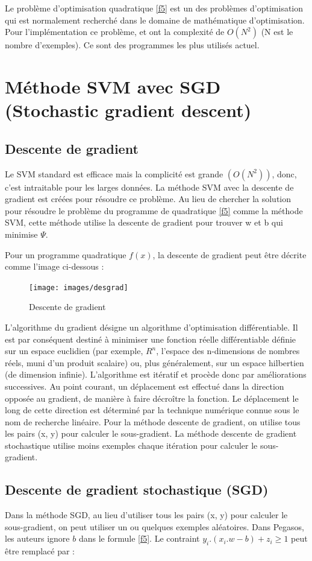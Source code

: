 Le problème d'optimisation quadratique \ref{f5} est un des problèmes d'optimisation qui est normalement recherché dans le domaine de mathématique d'optimisation. Pour l'implémentation ce problème, \cite{jp98} et \cite{cl01} ont la complexité de $O(N^2)$\cite{nk13} (N est le nombre d'exemples). Ce sont des programmes les plus utilisés actuel.

\section{Méthode SVM avec SGD (Stochastic gradient descent)}
\subsection{Descente de gradient}
Le SVM standard est efficace mais la complicité est grande $(O(N^2))$, donc, c'est intraitable pour les larges données. La méthode SVM avec la descente de gradient est créées pour résoudre ce problème. Au lieu de chercher la solution pour résoudre le problème du programme de quadratique \ref{f5} comme la méthode SVM, cette méthode utilise la descente de gradient pour trouver w et b qui minimise $\Psi$.

Pour un programme quadratique $f(x)$, la descente de gradient peut être décrite comme l'image ci-dessous :

\begin{figure}[H]
\centering
\texttt{[image: images/desgrad]}
\caption{Descente de gradient}
\label{descent_gradient}
\end{figure}

L'algorithme du gradient désigne un algorithme d'optimisation différentiable. Il est par conséquent destiné à minimiser une fonction réelle différentiable définie sur un espace euclidien (par exemple, $R^n$, l'espace des n-dimensions de nombres réels, muni d'un produit scalaire) ou, plus généralement, sur un espace hilbertien (de dimension infinie). L'algorithme est itératif et procède donc par améliorations successives. Au point courant, un déplacement est effectué dans la direction opposée au gradient, de manière à faire décroître la fonction. Le déplacement le long de cette direction est déterminé par la technique numérique connue sous le nom de recherche linéaire. Pour la méthode descente de gradient, on utilise tous les pairs (x, y) pour calculer le sous-gradient. La méthode descente de gradient stochastique utilise moins exemples chaque itération pour calculer le sous-gradient.

\subsection{Descente de gradient stochastique (SGD)}
Dans la méthode SGD, au lieu d'utiliser tous les pairs (x, y) pour calculer le sous-gradient, on peut utiliser un ou quelques exemples aléatoires. Dans Pegasos, les auteurs ignore $b$  dans le formule \ref{f5}. Le contraint $y_i.(x_i.w - b) + z_i \geq 1$ peut être remplacé par :

